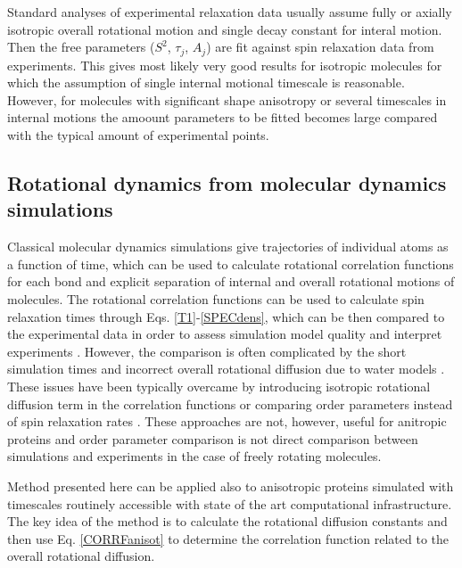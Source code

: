 \documentclass[pre,aps,floatfix,authordate1-4,twocolumn]{revtex4-1}
\begin{document}
Standard analyses of experimental relaxation data usually assume
fully or axially isotropic overall rotational motion and single
decay constant for interal motion. Then the free parameters
($S^2$, $\tau_j$, $A_j$) are fit against spin relaxation data
from experiments. This gives most likely very good results for
isotropic molecules for which the assumption of single internal
motional timescale is reasonable. However, for molecules with
significant shape anisotropy or several timescales in internal
motions the amoount parameters to be fitted becomes large compared
with the typical amount of experimental points.

\subsection{Rotational dynamics from molecular dynamics simulations}\label{MDanalysis}
Classical molecular dynamics simulations give trajectories of individual
atoms as a function of time, which can be used to calculate rotational
correlation functions for each bond and explicit separation of internal
and overall rotational motions of molecules. The rotational
correlation functions can be used to calculate spin relaxation times
through Eqs. \ref{T1}-\ref{SPECdens}, which can be then compared to the
experimental data in order to assess simulation model quality \cite{??} and interpret
experiments \cite{??}. However, the comparison is often complicated by
the short simulation times \cite{??} and incorrect overall rotational
diffusion due to water models \cite{??}. These issues have been typically
overcame by introducing isotropic rotational diffusion term in the correlation
functions \cite{??} or comparing order parameters instead of spin relaxation rates \cite{??}.
These approaches are not, however, useful for anitropic proteins and order
parameter comparison is not direct comparison between simulations and experiments in
the case of freely rotating molecules. 

Method presented here can be applied also to anisotropic proteins simulated
with timescales routinely accessible with state of the art computational
infrastructure. The key idea of the method is to calculate the rotational
diffusion constants and then use Eq. \ref{CORRFanisot} to determine the
correlation function related to the overall rotational diffusion. 
\end{document}
